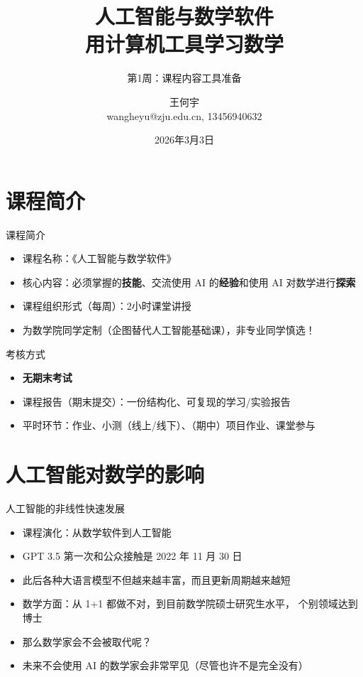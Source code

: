 \documentclass[10pt,aspectratio=169]{beamer}
\title[人工智能与数学软件]{\Large 人工智能与数学软件\\\small 用计算机工具学习数学}
\subtitle{第1周：课程内容工具准备}
\author{王何宇 \\ wangheyu@zju.edu.cn, 13456940632}
\institute{浙江大学数学科学学院}
\date{2026年3月3日}
\begin{document}
\begin{frame}[plain]
  \titlepage
\end{frame}

\section{课程简介}
\begin{frame}{课程简介}
\begin{itemize}
  \item 课程名称：《人工智能与数学软件》
  \item 核心内容：必须掌握的\textbf{技能}、交流使用 AI 的\textbf{经验}和使用 AI 对数学进行\textbf{探索}
  \item 课程组织形式（每周）：2小时课堂讲授
  \item 为数学院同学定制（企图替代人工智能基础课），非专业同学慎选！
\end{itemize}
\begin{block}{考核方式}
\begin{itemize}
  \item \textbf{无期末考试}
  \item 课程报告（期末提交）：一份结构化、可复现的学习/实验报告
  \item 平时环节：作业、小测（线上/线下）、（期中）项目作业、课堂参与
\end{itemize}
\end{block}
\end{frame}

\section{人工智能对数学的影响}

\begin{frame}{人工智能的非线性快速发展}
\begin{itemize}
    \item 课程演化：从数学软件到人工智能
    \item GPT 3.5 第一次和公众接触是 2022 年 11 月 30 日
    \item 此后各种大语言模型不但越来越丰富，而且更新周期越来越短
    \item 数学方面：从 1+1 都做不对，到目前数学院硕士研究生水平，\newline
    个别领域达到博士
    \item 那么数学家会不会被取代呢？
    \item<2-> 未来不会使用 AI 的数学家会非常罕见（尽管也许不是完全没有）
\end{itemize}
\end{frame}
\end{document}
